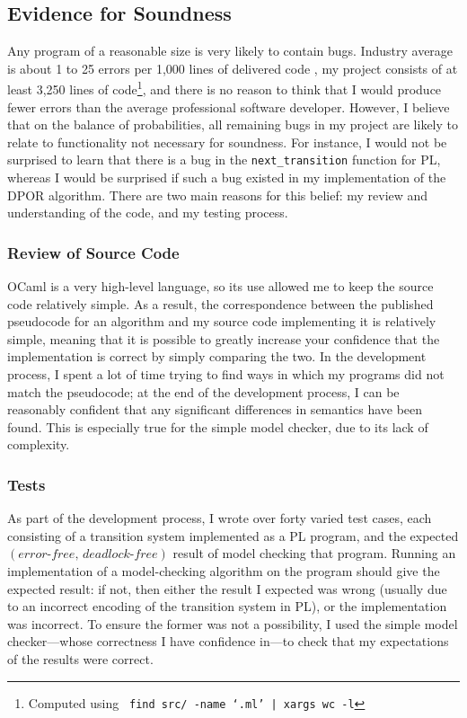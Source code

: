 \documentclass[12pt,a4paper,twoside,openright]{report}
\begin{document}
\subsection{Evidence for Soundness}
Any program of a reasonable size is very
likely to contain bugs. Industry average
is about 1 to 25 errors per 1,000 lines
of delivered code \cite{mccon04}, my project
consists of at least 3,250 lines of
code\footnote{Computed using
	\texttt{\,find src/ -name
		\textquoteleft*.ml\textquoteright
		| xargs wc -l}},
and there is no reason to think that I would
produce fewer errors than the average
professional software developer.
However, I believe that
on the balance of probabilities,
all remaining bugs in my project
are likely to relate
to functionality not necessary for
soundness. For instance, I would
not be surprised to learn that there
is a bug in the \texttt{next\_transition}
function for PL, whereas I would be
surprised if such a bug existed in
my implementation of the DPOR
algorithm. There are two main reasons
for this belief: my review and understanding
of the code, and my testing process.

\subsubsection{Review of Source Code}
OCaml is a very high-level language, so
its use allowed me to keep the source code
relatively simple. As a result,
the correspondence between
the published pseudocode for an algorithm
and my source code implementing it is
relatively simple, meaning that it
is possible to greatly increase
your confidence that
the implementation is correct by simply
comparing the two. In the development
process, I spent a lot of time trying
to find ways in which my programs did
not match the pseudocode; at the end
of the development process, I can be
reasonably confident that any significant differences
in semantics have been found.
This is especially
true for the simple model checker,
due to its lack of complexity.

\subsubsection{Tests}
\label{sec:pl-checker-tests}
As part of the development process,
I wrote over forty varied test cases, each
consisting of a transition system
implemented as a PL program, and
the expected
$(\textit{error-free},\, \textit{deadlock-free})$
result of model checking that program.
Running an implementation of a
model-checking algorithm on the
program should give the expected
result: if not, then either
the result I expected was wrong
(usually due to an incorrect encoding
of the transition system in PL),
or the implementation was incorrect.
To ensure the former was not a possibility,
I used the simple model checker---whose
correctness I have confidence in---to check that my
expectations of the results were correct.
\end{document}

